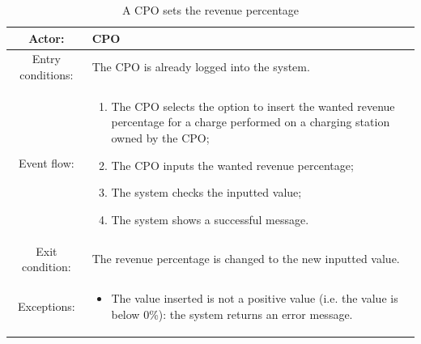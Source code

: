 \begin{table}[h]
    \begin{center}
        \begin{tabular}{|c||p{10cm}|}
            \hline
            Actor:            & \ac{CPO}                                                     \\
            \hline
            Entry conditions: & The \ac{CPO} is already logged into the system.              \\
            \hline
            Event flow:       &
            \begin{enumerate}
                \item The \ac{CPO} selects the option to insert the wanted revenue percentage for a charge performed on a charging station owned by the \ac{CPO};
                \item The \ac{CPO} inputs the wanted revenue percentage;
                \item The system checks the inputted value;
                \item The system shows a successful message.
            \end{enumerate}
            \\
            \hline
            Exit condition:   & The revenue percentage is changed to the new inputted value. \\
            \hline
            Exceptions:       &
            \begin{itemize}
                \item The value inserted is not a positive value (i.e. the value is below 0\%): the system returns an error message.
            \end{itemize}
            \\
            \hline
        \end{tabular}
    \end{center}
    \caption{A \ac{CPO} sets the revenue percentage}
\end{table}

